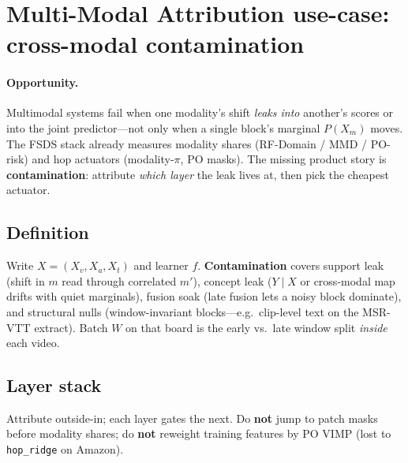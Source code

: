 
\section{Multi-Modal Attribution use-case: cross-modal contamination}
\label{sec:cross-modal-contamination}

\paragraph{Opportunity.}
Multimodal systems fail when one modality's shift \emph{leaks into} another's
scores or into the joint predictor---not only when a single block's marginal
$P(X_m)$ moves.
The FSDS stack already measures modality shares (RF-Domain / MMD / PO-risk)
and hop actuators (modality-$\pi$, PO masks).
The missing product story is \textbf{contamination}: attribute \emph{which
layer} the leak lives at, then pick the cheapest actuator.

\subsection{Definition}
Write $X=(X_v,X_a,X_t)$ and learner $f$.
\textbf{Contamination} covers support leak (shift in $m$ read through
correlated $m'$), concept leak ($Y\mid X$ or cross-modal map drifts with
quiet marginals), fusion soak (late fusion lets a noisy block dominate),
and structural nulls (window-invariant blocks---e.g.\ clip-level text on the
MSR-VTT extract).
Batch $W$ on that board is the early vs.\ late window split
\emph{inside} each video.

\subsection{Layer stack}
Attribute outside-in; each layer gates the next.
Do \textbf{not} jump to patch masks before modality shares; do \textbf{not}
reweight training features by PO VIMP (lost to \texttt{hop\_ridge} on Amazon).

